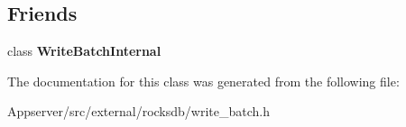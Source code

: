 \subsection*{Friends}
\begin{DoxyCompactItemize}
\item 
class {\bfseries Write\+Batch\+Internal}\hypertarget{classrocksdb_1_1WriteBatch_a0c491f15816190f8235ccd1367d5ae5f}{}\label{classrocksdb_1_1WriteBatch_a0c491f15816190f8235ccd1367d5ae5f}

\end{DoxyCompactItemize}


The documentation for this class was generated from the following file\+:\begin{DoxyCompactItemize}
\item 
Appserver/src/external/rocksdb/write\+\_\+batch.\+h\end{DoxyCompactItemize}
